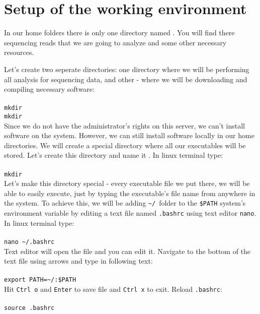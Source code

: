 \section{Setup of the working environment}
In our home folders there is only one directory named \texttt{\dataDir}.
You will find there \IonTorrent~ sequencing reads that we are going
to analyze and some other necessary resources.

Let's create two seperate directories:
one directory where we will be performing all analysis for sequencing data, and other -
where we will be downloading and compiling necessary software:\\~\\
\texttt{mkdir \workDir} \\
\texttt{mkdir \progDir} \\

Since we do not have the administrator's rights on this server, we can't install
software on the system. However, we can still install software locally in our home
directories. We will create a special directory where all our executables will be stored.
Let's create this directory and name it \texttt{\binDir}. In linux terminal type:\\~\\
\texttt{mkdir \binDir}\\

Let's make this directory special - every executable file we put there, we will be able
to easily execute, just by typing the executable's file name from anywhere in the system.
To achieve this, we will be adding \texttt{\textasciitilde/\binDir}~folder to the \texttt{\$PATH} 
system's environment variable by editing a text file named \texttt{.bashrc} using text editor \texttt{nano}.
In linux terminal type:\\~\\
\texttt{nano \textasciitilde/.bashrc}\\

Text editor will open the file and you can edit it. Navigate to the bottom of the text file using arrows
and type in following text:\\~\\
\texttt{export PATH=\textasciitilde/\binDir:\$PATH}\\

Hit \texttt{Ctrl o} and \texttt{Enter} to save file and \texttt{Ctrl x} to exit.
Reload \texttt{.bashrc}:\\~\\%
\texttt{source .bashrc}\\

